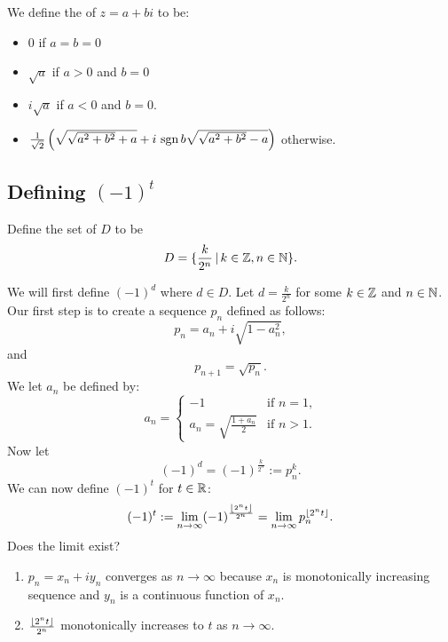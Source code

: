 \documentclass[notes]{subfile}
\begin{document}
\begin{definition}
    We define the  of $z = a+bi$ to be:
    \begin{itemize}
        \item $0$ if $a=b=0$
        \item $\sqrt{a}$ if $a>0$ and $b = 0$
        \item $i\sqrt{a}$ if $a < 0$ and $b = 0$.
        \item $\frac{1}{\sqrt{2}}\left( \sqrt{ \sqrt{a^2 + b^2} + a} 
            + i\, \operatorname{sgn}{b} \sqrt{\sqrt{a^2+b^2}-a} \right)$ otherwise. 
    \end{itemize}
\end{definition}


\subsection{Defining $(-1)^t$}

\begin{definition}
    Define the set of  $D$ to be
    \[ D = \{ \frac{k}{2^n} \, | \, k \in \operatorname{\mathbb{Z}}, n \in \operatorname{\mathbb{N}} \}. \]
\end{definition}

We will first define $(-1)^d$ where $d \in D$.
Let $d = \frac{k}{2^n}$ for some $k \in \operatorname{\mathbb{Z}}$ and $n \in \operatorname{\mathbb{N}}$.
Our first step is to create a sequence $p_n$ defined as follows:
\[ p_n = a_n + i \sqrt{1 - a_n^2}, \]
and 
\[ p_{n+1} = \sqrt{p_n}. \]
We let $a_n$ be defined by:
\[ a_n = \begin{cases}
        -1 & \text{if $n = 1$,} \\
        a_n = \sqrt{\frac{1 + a_n}{2}} & \text{if $n > 1$.}
    \end{cases}
\]
Now let
\[ (-1)^d = (-1)^{\frac{k}{2^n}} := p_n^k. \]
We can now define $(-1)^t$ for $t \in \operatorname{\mathbb{R}}$:
\[ (-1)^t := \lim_{n \to \infty} (-1)^{\frac{\left \lfloor{2^nt}\right \rfloor}{2^n}}
    = \lim_{n \to \infty} p_n^{\left \lfloor{2^nt}\right \rfloor}.
\]
Does the limit exist?

\begin{enumerate}
    \item $p_n = x_n + iy_n$ converges as $n \to \infty$
        because $x_n$ is monotonically increasing sequence
        and $y_n$ is a continuous function of $x_n$.

    \item $\frac{\left \lfloor{2^nt}\right \rfloor}{2^n}$ monotonically increases
        to $t$ as $n \to \infty$.
\end{enumerate}
\end{document}
